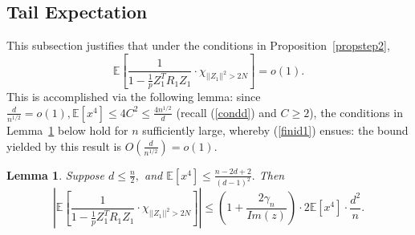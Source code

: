 \documentclass{article}
\newtheorem{lemma}{Lemma}
\numberwithin{equation}{section}
\begin{document}
\subsection{Tail Expectation}\label{subsect3.1}

This subsection justifies that under the conditions in Proposition~\ref{propstep2},
\begin{equation}\label{finid1}\tag{\(E1\)}
    \mathbb{E}[\frac{1}{1-\frac{1}{p}Z_1^TR_1Z_1}\cdot \chi_{||Z_1||^2>2N}]=o(1).
\end{equation}
This is accomplished via the following lemma: since \(\frac{d}{n^{1/2}}=o(1), \mathbb{E}[x^4] \leq 4C^2 \leq \frac{4n^{1/2}}{d}\) (recall (\ref{condd}) and \(C \geq 2\)), the conditions in Lemma~\ref{tailev} below hold for \(n\) sufficiently large, whereby (\ref{finid1}) ensues: the bound yielded by this result is \(O(\frac{d}{n^{1/2}})=o(1).\)

\begin{lemma}\label{tailev}
  Suppose \(d \leq \frac{n}{2},\) and \(\mathbb{E}[x^4] \leq \frac{n-2d+2}{(d-1)^2}.\) Then
    \[|\mathbb{E}[\frac{1}{1-\frac{1}{p}Z_1^TR_1Z_1} \cdot \chi_{||Z_1||^2>2N}]| \leq (1+\frac{2\gamma_n}{Im(z)}) \cdot 2\mathbb{E}[x^4] \cdot \frac{d^2}{n}.\]
\end{lemma}
\end{document}
